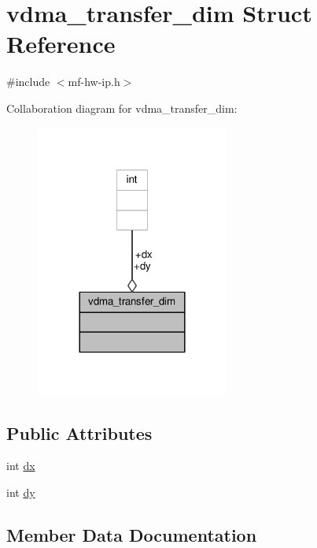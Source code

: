 \hypertarget{structvdma__transfer__dim}{}\section{vdma\+\_\+transfer\+\_\+dim Struct Reference}
\label{structvdma__transfer__dim}


{\ttfamily \#include $<$mf-\/hw-\/ip.\+h$>$}



Collaboration diagram for vdma\+\_\+transfer\+\_\+dim\+:
\nopagebreak
\begin{figure}[H]
\begin{center}
\leavevmode
\includegraphics[width=180pt]{structvdma__transfer__dim__coll__graph}
\end{center}
\end{figure}
\subsection*{Public Attributes}
\begin{DoxyCompactItemize}
\item 
int \hyperlink{structvdma__transfer__dim_a35aa29bbfcd3f86ed0bd78c9bf32cb71}{dx}
\item 
int \hyperlink{structvdma__transfer__dim_aa036b394a5a9b51a283bc55e9211a7e8}{dy}
\end{DoxyCompactItemize}


\subsection{Member Data Documentation}
